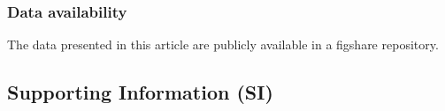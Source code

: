 \documentclass[9pt,twocolumn,twoside]{pnas-new}
\begin{document}
\subsubsection*{Data availability} The data presented in this article are publicly available in a figshare repository.

\subsection*{Supporting Information (SI)}

\end{document}
